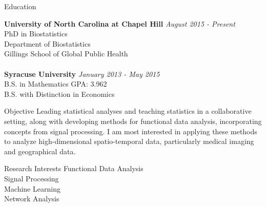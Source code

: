 \documentclass{resume} %
\begin{document}

\begin{rSection}{Education}

{\bf University of North Carolina at Chapel Hill} \hfill {\em August 2015 - Present} 
\\ PhD in Biostatistics
\\ Department of Biostatistics
\\ Gillings School of Global Public Health\\
\\{\bf Syracuse University} \hfill {\em January 2013 - May 2015} 
\\ B.S. in Mathematics\hfill { GPA: 3.962}
\\ B.S. with Distinction in Economics

\end{rSection}


\begin{rSection}{Objective}
Leading statistical analyses and teaching statistics in a collaborative setting, along with developing methods for functional data analysis, incorporating concepts from signal processing.  I am most interested in applying these methods to analyze high-dimensional spatio-temporal data, particularly medical imaging and geographical data.
\end{rSection}


\begin{rSection}{Research Interests}
Functional Data Analysis\\
Signal Processing\\
Machine Learning\\
Network Analysis
\end{rSection}
\end{document}
